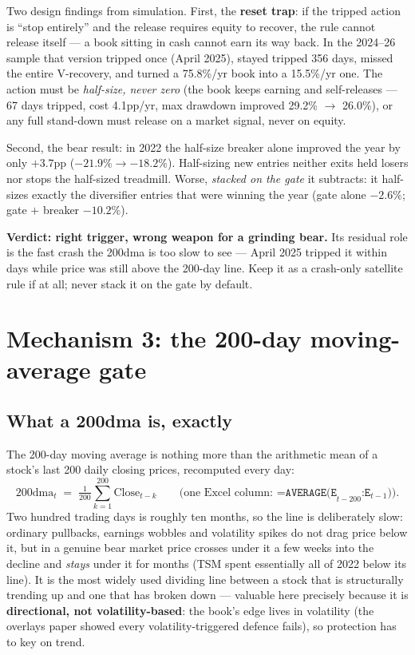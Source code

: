 \documentclass[11pt,a4paper]{article}
\begin{document}
Two design findings from simulation. First, the \textbf{reset trap}: if the
tripped action is ``stop entirely'' and the release requires equity to recover,
the rule cannot release itself --- a book sitting in cash cannot earn its way back.
In the 2024--26 sample that version tripped once (April 2025), stayed tripped 356
days, missed the entire V-recovery, and turned a 75.8\%/yr book into a 15.5\%/yr
one. The action must be \emph{half-size, never zero} (the book keeps earning and
self-releases --- 67 days tripped, cost 4.1pp/yr, max drawdown improved 29.2\%
$\rightarrow$ 26.0\%), or any full stand-down must release on a market signal,
never on equity.

Second, the bear result: in 2022 the half-size breaker alone improved the year by
only $+3.7$pp ($-21.9\% \rightarrow -18.2\%$). Half-sizing new entries neither
exits held losers nor stops the half-sized treadmill. Worse, \emph{stacked on the
gate} it subtracts: it half-sizes exactly the diversifier entries that were
winning the year (gate alone $-2.6\%$; gate $+$ breaker $-10.2\%$).

\textbf{Verdict: right trigger, wrong weapon for a grinding bear.} Its residual
role is the fast crash the 200dma is too slow to see --- April 2025 tripped it
within days while price was still above the 200-day line. Keep it as a
crash-only satellite rule if at all; never stack it on the gate by default.

\section{Mechanism 3: the 200-day moving-average gate}

\subsection{What a 200dma is, exactly}

The 200-day moving average is nothing more than the arithmetic mean of a stock's
last 200 daily closing prices, recomputed every day:
\[
\text{200dma}_t \;=\; \tfrac{1}{200}\textstyle\sum_{k=1}^{200} \text{Close}_{t-k}
\qquad\text{(one Excel column: } \texttt{=AVERAGE(E}_{t-200}\texttt{:E}_{t-1}\texttt{)).}
\]
Two hundred trading days is roughly ten months, so the line is deliberately slow:
ordinary pullbacks, earnings wobbles and volatility spikes do not drag price
below it, but in a genuine bear market price crosses under it a few weeks into
the decline and \emph{stays} under it for months (TSM spent essentially all of
2022 below its line). It is the most widely used dividing line between a stock
that is structurally trending up and one that has broken down --- valuable here
precisely because it is \textbf{directional, not volatility-based}: the book's
edge lives in volatility (the overlays paper showed every volatility-triggered
defence fails), so protection has to key on trend.
\end{document}
